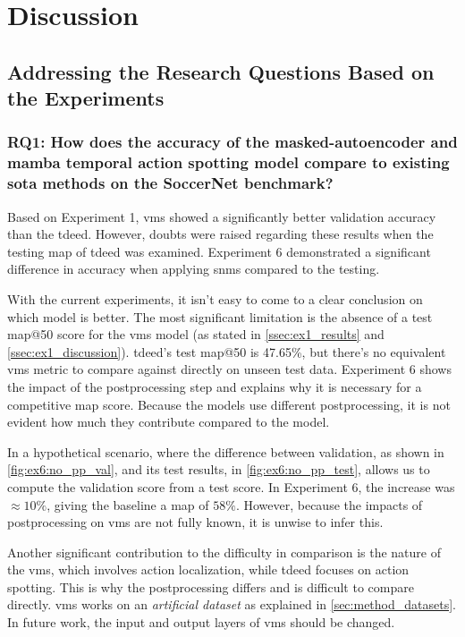 \chapter{Discussion}
\label{chap:discussion}

\section{Addressing the Research Questions Based on the Experiments}
\label{sec:addressing_rq_based_on_experiments}

\subsection{RQ1: How does the accuracy of the masked-autoencoder and mamba temporal action spotting model compare to existing \acrlong{sota} methods on the SoccerNet benchmark?}


Based on Experiment 1, \acrshort{vms} showed a significantly better validation accuracy than the \acrshort{tdeed}. However,  doubts were raised regarding these results when the testing \acrshort{map} of \acrshort{tdeed} was examined. Experiment 6 demonstrated a significant difference in accuracy when applying \acrfull{snms} compared to the testing. 

With the current experiments, it isn't easy to come to a clear conclusion on which model is better. The most significant limitation is the absence of a test \acrshort{map}@50 score for the \acrshort{vms} model (as stated in \cref{ssec:ex1_results} and \cref{ssec:ex1_discussion}). \acrshort{tdeed}'s test \acrshort{map}@50 is 47.65\%, but there's no equivalent \acrshort{vms} metric to compare against directly on unseen test data. Experiment 6 shows the impact of the postprocessing step and explains why it is necessary for a competitive \acrshort{map} score. Because the models use different postprocessing, it is not evident how much they contribute compared to the model. 

In a hypothetical scenario, where the difference between validation, as shown in \cref{fig:ex6:no_pp_val}, and its test results, in \cref{fig:ex6:no_pp_test}, allows us to compute the validation score from a test score. In Experiment 6, the increase was \(\approx10\%\), giving the baseline a \acrshort{map} of $58\%$. However, because the impacts of postprocessing on \acrshort{vms} are not fully known, it is unwise to infer this.

Another significant contribution to the difficulty in comparison is the nature of the \acrshort{vms}, which involves action localization, while \acrshort{tdeed} focuses on action spotting. This is why the postprocessing differs and is difficult to compare directly. \acrshort{vms} works on an \textit{artificial dataset} as explained in \cref{sec:method_datasets}. In future work, the input and output layers of \acrshort{vms} should be changed. 

